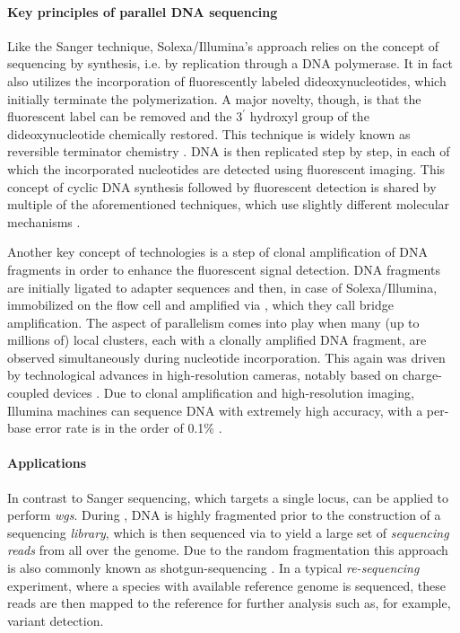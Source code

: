 \paragraph{Key principles of parallel DNA sequencing}
Like the Sanger technique, Solexa/Illumina’s approach relies on the concept of
sequencing by synthesis, i.e. by replication through a DNA polymerase. It in
fact also utilizes the incorporation of fluorescently labeled dideoxynucleotides,
which initially terminate the polymerization. A major novelty, though, is that
the fluorescent label can be removed and the $3^\prime$ hydroxyl group of the
dideoxynucleotide chemically restored. This technique is widely known as
reversible terminator chemistry \citep{Turcatti2008}. DNA is then replicated
step by step, in each of which the incorporated nucleotides are detected using
fluorescent imaging. This concept of cyclic DNA synthesis followed by
fluorescent detection is shared by multiple of the aforementioned techniques,
which use slightly different molecular mechanisms \citep{Shendure2008}.

Another key concept of \mps technologies is a step of clonal amplification of
DNA fragments in order to enhance the fluorescent signal detection. DNA
fragments are initially ligated to adapter sequences and then, in case of
Solexa/Illumina, immobilized on the flow cell and amplified via
    \citep{Mullis1990}, which they call bridge amplification.
The aspect of parallelism comes into play when many (up to millions of) local
clusters, each with a clonally amplified DNA fragment, are observed
simultaneously during nucleotide incorporation. This again was driven by
technological advances in high-resolution cameras, notably based on
charge-coupled devices \citep{Barbe1975,Shendure2008}. Due to clonal
amplification and high-resolution imaging, Illumina machines can sequence DNA
with extremely high accuracy, with a per-base error rate is in the order
of 0.1\% \citep{Fox2014}.

\paragraph{Applications}

In contrast to Sanger sequencing, which targets a single locus, \mps can be
applied to perform \emph{\acf{wgs}}. During \wgs, DNA is highly fragmented prior
to the construction of a sequencing \emph{library}, which is then sequenced via \mps to
yield a large set of \emph{sequencing reads} from
all over the genome. Due to the random fragmentation this approach is also
commonly known as shotgun-sequencing \citep{Weber1997}. In a typical
\emph{re-sequencing} experiment, where a species with available reference genome
is sequenced, these reads are then mapped to the reference for further analysis
such as, for example, variant detection.

